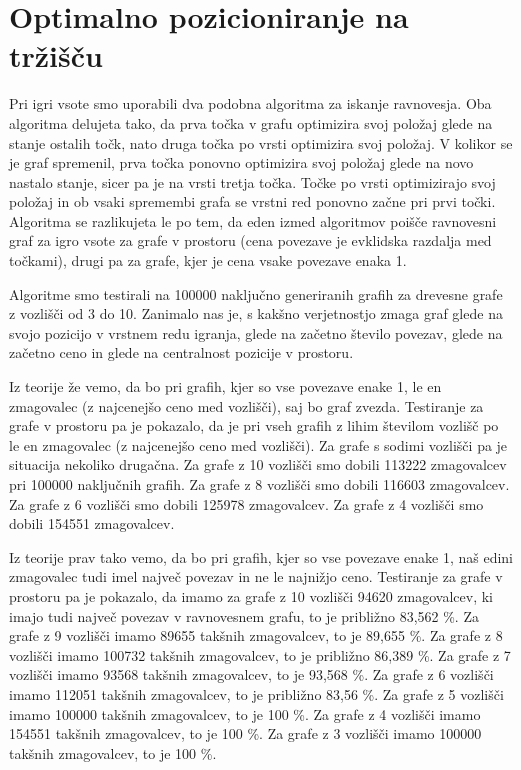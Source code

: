 \documentclass[fin1, tisk]{fmfdelo}
\begin{document}
\section{Optimalno pozicioniranje na tržišču}

Pri igri vsote smo uporabili dva podobna algoritma za iskanje ravnovesja. Oba algoritma delujeta tako, da prva točka v grafu optimizira svoj položaj glede na stanje ostalih točk, nato druga točka po vrsti optimizira svoj položaj. V kolikor se je graf spremenil, prva točka ponovno optimizira svoj položaj glede na novo nastalo stanje, sicer pa je na vrsti tretja točka. Točke po vrsti optimizirajo svoj položaj in ob vsaki spremembi grafa se vrstni red ponovno začne pri prvi točki. Algoritma se razlikujeta le po tem, da eden izmed algoritmov poišče ravnovesni graf za igro vsote za grafe v prostoru (cena povezave je evklidska razdalja med točkami), drugi pa za grafe, kjer je cena vsake povezave enaka 1.

Algoritme smo testirali na 100000 naključno generiranih grafih za drevesne grafe z vozlišči od 3 do 10. Zanimalo nas je, s kakšno verjetnostjo zmaga graf glede na svojo pozicijo v vrstnem redu igranja, glede na začetno število povezav, glede na začetno ceno in glede na centralnost pozicije v prostoru.

Iz teorije že vemo, da bo pri grafih, kjer so vse povezave enake 1, le en zmagovalec (z najcenejšo ceno med vozlišči), saj bo graf zvezda. Testiranje za grafe v prostoru pa je pokazalo, da je pri vseh grafih z lihim številom vozlišč po le en zmagovalec (z najcenejšo ceno med vozlišči). Za grafe s sodimi vozlišči pa je situacija nekoliko drugačna. Za grafe z 10 vozlišči smo dobili 113222 zmagovalcev pri 100000 naključnih grafih. Za grafe z 8 vozlišči smo dobili 116603 zmagovalcev. Za grafe z 6 vozlišči smo dobili 125978 zmagovalcev. Za grafe z 4 vozlišči smo dobili 154551 zmagovalcev.

Iz teorije prav tako vemo, da bo pri grafih, kjer so vse povezave enake 1, naš edini zmagovalec tudi imel največ povezav in ne le najnižjo ceno. Testiranje za grafe v prostoru pa je pokazalo, da imamo za grafe z 10 vozlišči 94620 zmagovalcev, ki imajo tudi največ povezav v ravnovesnem grafu, to je približno 83,562 \%. Za grafe z 9 vozlišči imamo 89655 takšnih zmagovalcev, to je 89,655 \%. Za grafe z 8 vozlišči imamo 100732 takšnih zmagovalcev, to je približno 86,389 \%. Za grafe z 7 vozlišči imamo 93568 takšnih zmagovalcev, to je 93,568 \%. Za grafe z 6 vozlišči imamo 112051 takšnih zmagovalcev, to je približno 83,56 \%. Za grafe z 5 vozlišči imamo 100000 takšnih zmagovalcev, to je 100 \%. Za grafe z 4 vozlišči imamo 154551 takšnih zmagovalcev, to je 100 \%. Za grafe z 3 vozlišči imamo 100000 takšnih zmagovalcev, to je 100 \%.
\end{document}
